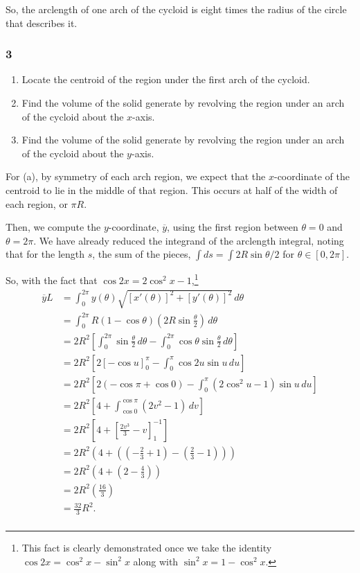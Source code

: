 \documentclass[../hw10]{subfiles}
\begin{document}
So, the arclength of one arch of the cycloid is eight times the radius of the circle that describes it.

\subsubsection*{3}
\begin{enumerate}[label=\alph*.]
    \item Locate the centroid of the region under the first arch of the cycloid.
    \item Find the volume of the solid generate by revolving the region under an arch of the cycloid about the $x$-axis.
    \item Find the volume of the solid generate by revolving the region under an arch of the cycloid about the $y$-axis.
\end{enumerate}

For (a), by symmetry of each arch region, we expect that the $x$-coordinate of the centroid to lie in the middle of that region. This occurs at half of the width of each region, or $\pi R$.

Then, we compute the $y$-coordinate, $\overline{y}$, using the first region between $\theta=0$ and $\theta=2\pi$. We have already reduced the integrand of the arclength integral, noting that for the length $s$, the sum of the pieces, $\int ds = \int 2R\sin{\theta/2}$ for $\theta\in[0,2\pi]$.

So, with the fact that $\cos{2x}=2\cos^2{x}-1$,\footnote{This fact is clearly demonstrated once we take the identity $\cos{2x}=\cos^2{x}-\sin^2{x}$ along with $\sin^2{x}=1-\cos^2{x}$.}
\begin{align*}
    \overline{y}L &= \int_{0}^{2\pi} y(\theta) \sqrt{{[x'(\theta)]}^2+{[y'(\theta)]}^2}\, d\theta \\
    &= \int_{0}^{2\pi} R(1-\cos{\theta})\left( 2R\sin{\frac{\theta}{2}} \right)\, d\theta \\
    &= 2R^2 \left[ \int_{0}^{2\pi} \sin{\frac{\theta}{2}} \, d\theta - \int_{0}^{2\pi} \cos{\theta}\sin{\frac{\theta}{2}} \, d\theta \right] \\
    &= 2R^2 \left[ 2 {\left[ -\cos{u} \right]}_{0}^{\pi} - \int_{0}^{\pi} \cos{2u}\sin{u} \, du \right] \\
    &= 2R^2 \left[ 2(-\cos{\pi}+\cos{0}) - \int_{0}^{\pi} \left( 2\cos^2{u}-1 \right)\sin{u} \, du \right] \\
    &= 2R^2 \left[ 4 + \int_{\cos{0}}^{\cos{\pi}} \left( 2v^2-1 \right)\, dv \right] \\
    &= 2R^2 \left[ 4 + {\left[ \frac{2v^3}{3}-v \right]}_{1}^{-1} \right] \\
    &= 2R^2 \left( 4 + \left( \left( -\frac{2}{3}+1 \right) - \left( \frac{2}{3}-1 \right)\right) \right) \\
    &= 2R^2 \left( 4 + \left( 2 - \frac{4}{3} \right) \right) \\
    &= 2R^2 \left( \frac{16}{3} \right)\\
    &= \frac{32}{3} R^2. \\
\end{align*}
\end{document}
